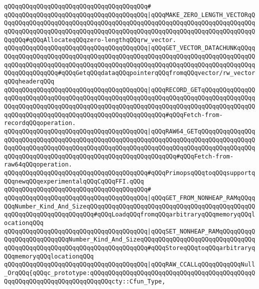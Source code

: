 \verb|qQQqqQQqqQQqqQQqqQQqqQQqqQQqqQQqqQQqqQQq#|\newline
\verb|qQQqqQQqqQQqqQQqqQQqqQQqqQQqqQQqqQQqqQQq|\verb#|qQQqMAKE_ZERO_LENGTH_VECTORqQQqqQQqqQQqqQQqqQQqqQQqqQQqqQQqqQQqqQQqqQQqqQQqqQQqqQQqqQQqqQQqqQQqqQQqqQQqqQQqqQQqqQQqqQQqqQQqqQQqqQQqqQQqqQQqqQQqqQQqqQQqqQQqqQQqqQQqqQQqqQQqqQQq#\verb|#qQQqAllocateqQQqzero-lengthqQQqrw_vector.|\newline
\verb|qQQqqQQqqQQqqQQqqQQqqQQqqQQqqQQqqQQqqQQq|\verb#|qQQqGET_VECTOR_DATACHUNKqQQqqQQqqQQqqQQqqQQqqQQqqQQqqQQqqQQqqQQqqQQqqQQqqQQqqQQqqQQqqQQqqQQqqQQqqQQqqQQqqQQqqQQqqQQqqQQqqQQqqQQqqQQqqQQqqQQqqQQqqQQqqQQqqQQqqQQqqQQqqQQqqQQqqQQqqQQqqQQq#\verb|#qQQqGetqQQqdataqQQqpointerqQQqfromqQQqvector/rw_vectorqQQqheaderqQQq|\newline
\verb|qQQqqQQqqQQqqQQqqQQqqQQqqQQqqQQqqQQqqQQq|\verb#|qQQqRECORD_GETqQQqqQQqqQQqqQQqqQQqqQQqqQQqqQQqqQQqqQQqqQQqqQQqqQQqqQQqqQQqqQQqqQQqqQQqqQQqqQQqqQQqqQQqqQQqqQQqqQQqqQQqqQQqqQQqqQQqqQQqqQQqqQQqqQQqqQQqqQQqqQQqqQQqqQQqqQQqqQQqqQQqqQQqqQQqqQQqqQQqqQQqqQQqqQQqqQQqqQQq#\verb|#qQQqFetch-from-recordqQQqoperation.|\newline
\verb|qQQqqQQqqQQqqQQqqQQqqQQqqQQqqQQqqQQqqQQq|\verb#|qQQqRAW64_GETqQQqqQQqqQQqqQQqqQQqqQQqqQQqqQQqqQQqqQQqqQQqqQQqqQQqqQQqqQQqqQQqqQQqqQQqqQQqqQQqqQQqqQQqqQQqqQQqqQQqqQQqqQQqqQQqqQQqqQQqqQQqqQQqqQQqqQQqqQQqqQQqqQQqqQQqqQQqqQQqqQQqqQQqqQQqqQQqqQQqqQQqqQQqqQQqqQQqqQQqqQQq#\verb|#qQQqFetch-from-raw64qQQqoperation.|\newline
\newline
\verb|qQQqqQQqqQQqqQQqqQQqqQQqqQQqqQQqqQQqqQQq#qQQqPrimopsqQQqtoqQQqsupportqQQqnewqQQqexperimentalqQQqCqQQqFFI.qQQq|\newline
\verb|qQQqqQQqqQQqqQQqqQQqqQQqqQQqqQQqqQQqqQQq#|\newline
\verb|qQQqqQQqqQQqqQQqqQQqqQQqqQQqqQQqqQQqqQQq|\verb#|qQQqGET_FROM_NONHEAP_RAMqQQqqQQqNumber_Kind_And_SizeqQQqqQQqqQQqqQQqqQQqqQQqqQQqqQQqqQQqqQQqqQQqqQQqqQQqqQQqqQQqqQQqqQQqqQQq#\verb|#qQQqLoadqQQqfromqQQqarbitraryqQQqmemoryqQQqlocationqQQq|\newline
\verb|qQQqqQQqqQQqqQQqqQQqqQQqqQQqqQQqqQQqqQQq|\verb#|qQQqSET_NONHEAP_RAMqQQqqQQqqQQqqQQqqQQqqQQqqQQqNumber_Kind_And_SizeqQQqqQQqqQQqqQQqqQQqqQQqqQQqqQQqqQQqqQQqqQQqqQQqqQQqqQQqqQQqqQQqqQQqqQQq#\verb|#qQQqStoreqQQqtoqQQqarbitraryqQQqmemoryqQQqlocationqQQq|\newline
\newline
\verb|qQQqqQQqqQQqqQQqqQQqqQQqqQQqqQQqqQQqqQQq|\verb#|qQQqRAW_CCALLqQQqqQQqqQQqNull_OrqQQq{qQQqc_prototype:qQQqqQQqqQQqqQQqqQQqqQQqqQQqqQQqqQQqqQQqqQQqqQQqqQQqqQQqqQQqqQQqqQQqqQQqqQQqcty::Cfun_Type,#\newline
